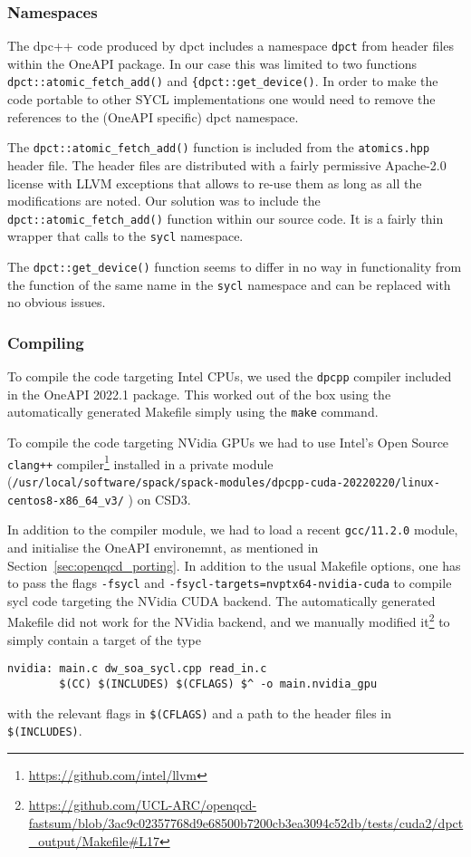 \subsubsection{Namespaces}\label{sec:openqcd_namespaces}

The dpc++ code produced by dpct includes a namespace \texttt{dpct} from header files within the OneAPI package.
In our case this was limited to two functions \verb!dpct::atomic_fetch_add()! and \verb!{dpct::get_device()!.
In order to make the code portable to other SYCL implementations one would need to remove the references to the (OneAPI specific) dpct namespace.

The \verb!dpct::atomic_fetch_add()! function is included from the \texttt{atomics.hpp} header file.
The header files are distributed with a fairly permissive Apache-2.0 license with LLVM exceptions that allows to re-use them as long as all the modifications are noted.
Our solution was to include the \verb!dpct::atomic_fetch_add()! function within our source code.
It is a fairly thin wrapper that calls to the \texttt{sycl} namespace.

The \verb!dpct::get_device()! function seems to differ in no way in functionality from the function of the same name in the \texttt{sycl} namespace and can be replaced with no obvious issues.

\subsubsection{Compiling}\label{sec:openqcd_compiling}

To compile the code targeting Intel CPUs, we used the \texttt{dpcpp} compiler included in the OneAPI 2022.1 package.
This worked out of the box using the automatically generated Makefile simply using the \texttt{make} command.

To compile the code targeting NVidia GPUs we had to use Intel's Open Source \verb #clang++# compiler\footnote{\url{https://github.com/intel/llvm}} installed in a private module (\verb #/usr/local/software/spack/spack-modules/dpcpp-cuda-20220220/linux-centos8-x86_64_v3/# ) on CSD3.

In addition to the compiler module, we had to load a recent \verb #gcc/11.2.0# module, and initialise the OneAPI environemnt, as mentioned in Section~\ref{sec:openqcd_porting}.
In addition to the usual Makefile options, one has to pass the flags \verb #-fsycl# and \verb #-fsycl-targets=nvptx64-nvidia-cuda# to compile sycl code targeting the NVidia CUDA backend.
The automatically generated Makefile did not work for the NVidia backend, and we manually modified it\footnote{\url{https://github.com/UCL-ARC/openqcd-fastsum/blob/3ac9c02357768d9e68500b7200cb3ea3094c52db/tests/cuda2/dpct_output/Makefile\#L17}} to simply contain a target of the type
\begin{verbatim}
nvidia: main.c dw_soa_sycl.cpp read_in.c
        $(CC) $(INCLUDES) $(CFLAGS) $^ -o main.nvidia_gpu
\end{verbatim}
with the relevant flags in \verb #$(CFLAGS)# and a path to the header files in \verb #$(INCLUDES)#.

